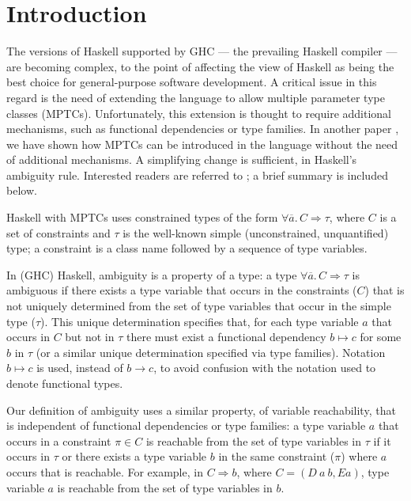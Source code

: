 \section{Introduction}
\label{sec:intro}

The versions of Haskell supported by GHC --- the prevailing Haskell
compiler --- are becoming complex, to the point of affecting the view
of Haskell as being the best choice for general-purpose software
development. A critical issue in this regard is the need of extending
the language to allow multiple parameter type classes
(MPTCs). Unfortunately, this extension is thought to require
additional mechanisms, such as functional dependencies or type
families. In another paper
\cite{JBCS-Ambiguity-and-constrained-polymorphism}, we have shown how
MPTCs can be introduced in the language without the need of additional
mechanisms. A simplifying change is sufficient, in Haskell's ambiguity
rule. Interested readers are referred to
\cite{JBCS-Ambiguity-and-constrained-polymorphism}; a brief summary is
included below.

Haskell with MPTCs uses constrained types of the form $\forall
\overline{a}.\,C \Rightarrow \tau$, where $C$ is a set of constraints
and $\tau$ is the well-known simple (unconstrained, unquantified)
type; a constraint is a class name followed by a sequence of type
variables.

In (GHC) Haskell, ambiguity is a property of a type: a type $\forall
\overline{a}.\,C \Rightarrow \tau$ is ambiguous if there exists a type
variable that occurs in the constraints ($C$) that is not uniquely
determined from the set of type variables that occur in the simple
type ($\tau$). This unique determination specifies that, for each type
variable $a$ that occurs in $C$ but not in $\tau$ there must exist a
functional dependency $b \mapsto c$ for some $b$ in $\tau$ (or a
similar unique determination specified via type families). Notation $b
\mapsto c$ is used, instead of $b \rightarrow c$, to avoid confusion
with the notation used to denote functional types.

Our definition of ambiguity uses a similar property, of variable
reachability, that is independent of functional dependencies or type
families: a type variable $a$ that occurs in a constraint $\pi \in C$
is reachable from the set of type variables in $\tau$ if it occurs in
$\tau$ or there exists a type variable $b$ in the same constraint
($\pi$) where $a$ occurs that is reachable. For example, in $C
\Rightarrow b$, where $C = (D\: a\: b, E a)$, type variable $a$ is
reachable from the set of type variables in $b$.

